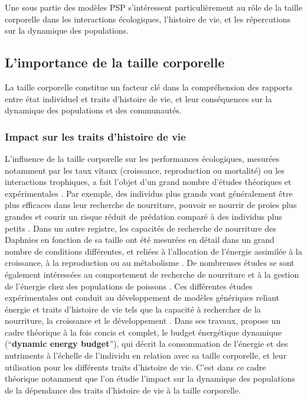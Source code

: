 Une sous partie des modèles PSP s'intéressent particulièrement au rôle de la
taille corporelle dans les interactions écologiques, l'histoire de vie, et les
répercutions sur la dynamique des populations. 

\subsection{L'importance de la taille corporelle}

La taille corporelle constitue un facteur clé dans la compréhension des rapports
entre état individuel et traits d'histoire de vie, et leur conséquences sur la
dynamique des populations et des communautés. 

\subsubsection{Impact sur les traits d'histoire de vie}

L'influence de la taille corporelle sur les performances écologiques, mesurées
notamment par les taux vitaux (croissance, reproduction ou mortalité) ou les
interactions trophiques, a fait l'objet d'un grand nombre d'études théoriques
et expérimentales
\autocites{peters1986a,calder1996a,de-roos2001a,claessen2004a}. Par
exemple, des individus plus grands vont généralement être plus efficaces dans
leur recherche de nourriture, pouvoir se nourrir de proies plus grandes et
courir un risque réduit de prédation comparé à des individus plus petits
\autocites{paradis1996a}.
Dans un autre registre, les capacités de recherche de nourriture des Daphnies
en fonction de sa taille ont été mesurées en détail dans un grand nombre de
conditions différentes, et reliées à l'allocation de l'énergie assimilée à la
croissance, à la reproduction ou au métabolisme \autocites[par ex.
][]{lampert1978a,gurney1990a,mccauley1990a,kooijman2000a}. De nombreuses études
se sont également intéressées au comportement de recherche de nourriture et à la
gestion de l'énergie chez des populations de poissons \autocites[par ex.
][]{elliott1975a,mittelbach1981a,fuiman1994a,hjelm2001a}. Ces différentes études
expérimentales ont conduit au développement de modèles génériques reliant
énergie et traits d'histoire de vie tels que la capacité à rechercher de la
nourriture, la croissance et le développement
\autocites{kooijman2000a, nisbet2000a, west2001a}. Dans ses travaux,
\textcite{kooijman2000a} propose un cadre théorique à la fois concis et complet,
le budget énergétique dynamique (``\textbf{dynamic energy budget}''), qui décrit
la consommation  de l'énergie et des nutriments à l'échelle de l'individu en
relation avec sa taille corporelle, et leur utilisation pour les différents
traits d'histoire de vie. C'est dans ce cadre théorique notamment que l'on
étudie l'impact sur la dynamique des populations de la dépendance des traits
d'histoire de vie à la taille corporelle.

